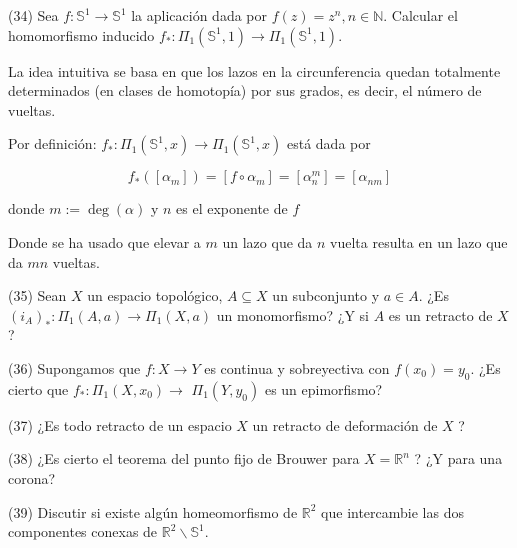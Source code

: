 \documentclass[
  a4paper,
  spanish,
  12pt,
]{scrartcl}
\begin{document}
\begin{ejer}
(34) Sea $f: \mathbb{S}^{1} \rightarrow \mathbb{S}^{1}$ la aplicación dada por $f(z)=z^{n}, n \in \mathbb{N}$. Calcular el homomorfismo inducido $f_{*}: \Pi_{1}\left(\mathbb{S}^{1}, 1\right) \rightarrow \Pi_{1}\left(\mathbb{S}^{1}, 1\right)$.\\
\end{ejer}

\begin{sol}
La idea intuitiva se basa en que los lazos en la circunferencia quedan totalmente determinados
(en clases de homotopía) por sus grados, es decir, el número de vueltas.

Por definición: $f_* : \Pi_1(\mathbb{S}^1, x) \rightarrow \Pi_1(\mathbb{S}^1, x)$ está dada por

$$
f_*([\alpha_m]) = [f \circ \alpha_m ] = [\alpha_n^m] = [\alpha_{nm}]
$$

donde $m := \operatorname{deg}(\alpha)$ y $n$ es el exponente de $f$

Donde se ha usado que elevar a $m$ un lazo que da $n$ vuelta resulta en un lazo que da $mn$ vueltas.
\end{sol}

\begin{ejer}
(35) Sean $X$ un espacio topológico, $A \subseteq X$ un subconjunto y $a \in A$. ¿Es $\left(i_{A}\right)_{*}: \Pi_{1}(A, a) \rightarrow \Pi_{1}(X, a)$ un monomorfismo? ¿Y si $A$ es un retracto de $X$ ?\\
\end{ejer}

\begin{ejer}
(36) Supongamos que $f: X \rightarrow Y$ es continua y sobreyectiva con $f\left(x_{0}\right)=y_{0}$. ¿Es cierto que $f_{*}: \Pi_{1}\left(X, x_{0}\right) \rightarrow$ $\Pi_{1}\left(Y, y_{0}\right)$ es un epimorfismo?\\
\end{ejer}

\begin{ejer}
(37) ¿Es todo retracto de un espacio $X$ un retracto de deformación de $X$ ?\\
\end{ejer}

\begin{ejer}
(38) ¿Es cierto el teorema del punto fijo de Brouwer para $X=\mathbb{R}^{n}$ ? ¿Y para una corona?\\
\end{ejer}

\begin{ejer}
(39) Discutir si existe algún homeomorfismo de $\mathbb{R}^{2}$ que intercambie las dos componentes conexas de $\mathbb{R}^{2} \backslash \mathbb{S}^{1}$.
\end{ejer}
\end{document}
